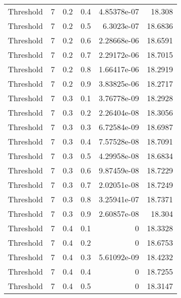 \documentclass{article}
\begin{document}
\begin{longtable}[H]{lrrrrr}
 Threshold      &       7 &   0.2 &            0.4 &      4.85378e-07 &         18.308  \\
 Threshold      &       7 &   0.2 &            0.5 &      6.3023e-07  &         18.6836 \\
 Threshold      &       7 &   0.2 &            0.6 &      2.28668e-06 &         18.6591 \\
 Threshold      &       7 &   0.2 &            0.7 &      2.29172e-06 &         18.7015 \\
 Threshold      &       7 &   0.2 &            0.8 &      1.66417e-06 &         18.2919 \\
 Threshold      &       7 &   0.2 &            0.9 &      3.83825e-06 &         18.2717 \\
 Threshold      &       7 &   0.3 &            0.1 &      3.76778e-09 &         18.2928 \\
 Threshold      &       7 &   0.3 &            0.2 &      2.26404e-08 &         18.3056 \\
 Threshold      &       7 &   0.3 &            0.3 &      6.72584e-09 &         18.6987 \\
 Threshold      &       7 &   0.3 &            0.4 &      7.57528e-08 &         18.7091 \\
 Threshold      &       7 &   0.3 &            0.5 &      4.29958e-08 &         18.6834 \\
 Threshold      &       7 &   0.3 &            0.6 &      9.87459e-08 &         18.7229 \\
 Threshold      &       7 &   0.3 &            0.7 &      2.02051e-08 &         18.7249 \\
 Threshold      &       7 &   0.3 &            0.8 &      3.25941e-07 &         18.7371 \\
 Threshold      &       7 &   0.3 &            0.9 &      2.60857e-08 &         18.304  \\
 Threshold      &       7 &   0.4 &            0.1 &      0           &         18.3328 \\
 Threshold      &       7 &   0.4 &            0.2 &      0           &         18.6753 \\
 Threshold      &       7 &   0.4 &            0.3 &      5.61092e-09 &         18.4232 \\
 Threshold      &       7 &   0.4 &            0.4 &      0           &         18.7255 \\
 Threshold      &       7 &   0.4 &            0.5 &      0           &         18.3147 \\

\end{longtable}
\end{document}
